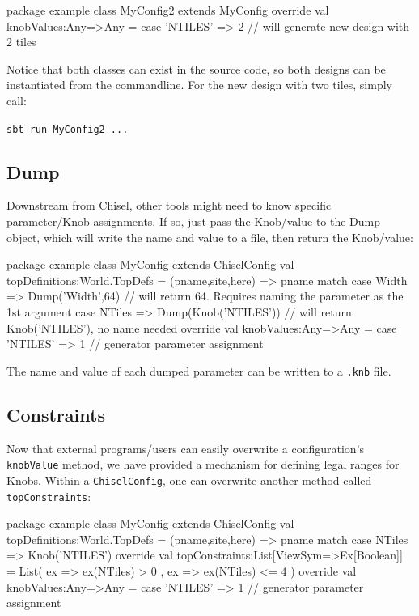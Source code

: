 \documentclass[10pt,twocolumn]{article}
\def\code#1{{\small\tt #1}}
\begin{document}
\begin{scala}
package example
class MyConfig2 extends MyConfig {
  override val knobValues:Any=>Any = {
    case 'NTILES' => 2 // will generate new design with 2 tiles
  }
}
\end{scala}

Notice that both classes can exist in the source code, so both designs
can be instantiated from the commandline.
For the new design with two tiles, simply call:

\code{sbt run MyConfig2 ... }

\subsection{Dump}

Downstream from Chisel, other tools might need to know specific parameter/Knob assignments. If so, just pass the Knob/value to the Dump object, which will write the name and value to a file, then return the Knob/value:

\begin{scala}
package example
class MyConfig extends ChiselConfig {
  val topDefinitions:World.TopDefs = {
    (pname,site,here) => pname match {
      case Width => Dump('Width',64) // will return 64. Requires naming the parameter as the 1st argument
      case NTiles => Dump(Knob('NTILES')) // will return Knob('NTILES'), no name needed
    }
  }
  override val knobValues:Any=>Any = {
    case 'NTILES' => 1 // generator parameter assignment
  }
}
\end{scala}

The name and value of each dumped parameter can be
written to a \code{*.knb} file.

\subsection{Constraints}

Now that external programs/users can easily overwrite a configuration's \code{knobValue} method, we have provided a mechanism for defining legal ranges for Knobs. Within a \code{ChiselConfig}, one can overwrite another method called \code{topConstraints}:

\begin{scala}
package example
class MyConfig extends ChiselConfig {
  val topDefinitions:World.TopDefs = {
    (pname,site,here) => pname match {
      case NTiles => Knob('NTILES')
    }
  }
  override val topConstraints:List[ViewSym=>Ex[Boolean]] 
    = List( { ex => ex(NTiles) >  0 },
            { ex => ex(NTiles) <= 4 })
  override val knobValues:Any=>Any = {
    case 'NTILES' => 1 // generator parameter assignment
  }
}
\end{scala}
\end{document}
